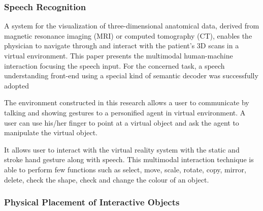 \subsubsection{Speech Recognition}

A system for the visualization of three-dimensional anatomical data, derived from magnetic resonance imaging (MRI) or computed tomography (CT), enables the physician to navigate through and interact with the patient's 3D scans in a virtual environment. This paper presents the multimodal human-machine interaction focusing the speech input. For the concerned task, a speech understanding front-end using a special kind of semantic decoder was successfully adopted
\cite{Muller1998}

The environment constructed in this research allows a user to communicate by talking and showing gestures
to a personified agent in virtual environment. A user can use his/her finger to point at a virtual object and ask the agent to manipulate the virtual object.
\cite{Uchino2008}

It allows user to interact with the virtual reality system with the static and stroke hand gesture along with speech. This multimodal interaction technique is able to perform few functions such as select, move, scale, rotate, copy, mirror, delete, check the shape, check and change the colour of an object.
\cite{Chun2015}


\subsubsection{Physical Placement of Interactive Objects}

